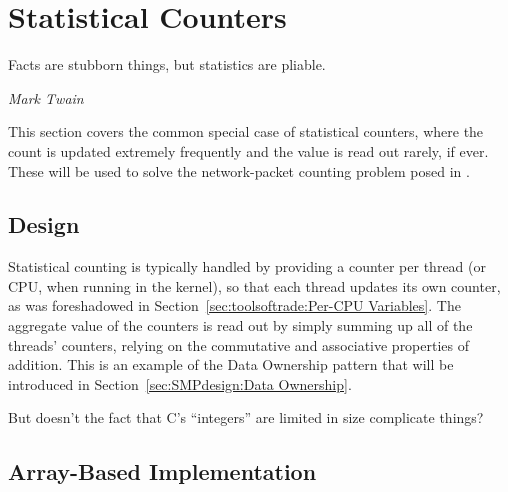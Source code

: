 \section{Statistical Counters}
\label{sec:count:Statistical Counters}
%
\epigraph{Facts are stubborn things, but statistics are pliable.}
	 {\emph{Mark Twain}}

This section covers the common special case of statistical counters, where
the count is updated extremely frequently and the value is read out
rarely, if ever.
These will be used to solve the network-packet counting problem
posed in \QuickQuizRef{\QcountQstatcnt}.

\subsection{Design}

Statistical counting is typically handled by providing a counter per
thread (or CPU, when running in the kernel), so that each thread
updates its own counter, as was foreshadowed in
Section~\ref{sec:toolsoftrade:Per-CPU Variables}.
The aggregate value of the counters is read out by simply summing up
all of the threads' counters,
relying on the commutative and associative properties of addition.
This is an example of the Data Ownership pattern that will be introduced in
Section~\ref{sec:SMPdesign:Data Ownership}.

\QuickQuiz{}
	But doesn't the fact that C's ``integers'' are limited in size
	complicate things?
 \QuickQuizEnd

\subsection{Array-Based Implementation}
\label{sec:count:Array-Based Implementation}

